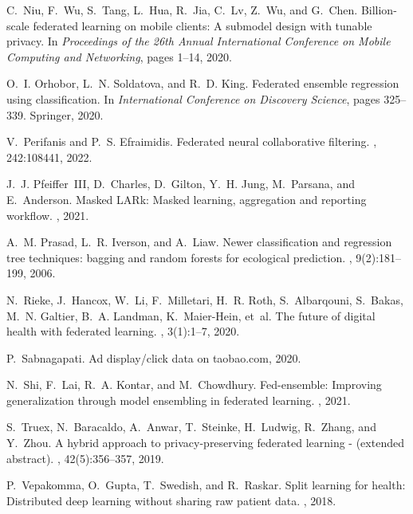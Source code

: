 \documentclass{article}
\begin{document}
\begin{thebibliography}{10}
C.~Niu, F.~Wu, S.~Tang, L.~Hua, R.~Jia, C.~Lv, Z.~Wu, and G.~Chen.
\newblock Billion-scale federated learning on mobile clients: A submodel design
  with tunable privacy.
\newblock In {\em Proceedings of the 26th Annual International Conference on
  Mobile Computing and Networking}, pages 1--14, 2020.

O.~I. Orhobor, L.~N. Soldatova, and R.~D. King.
\newblock Federated ensemble regression using classification.
\newblock In {\em International Conference on Discovery Science}, pages
  325--339. Springer, 2020.

V.~Perifanis and P.~S. Efraimidis.
\newblock Federated neural collaborative filtering.
, 242:108441, 2022.

J.~J. Pfeiffer~III, D.~Charles, D.~Gilton, Y.~H. Jung, M.~Parsana, and
  E.~Anderson.
\newblock Masked {LARk}: Masked learning, aggregation and reporting workflow.
, 2021.

A.~M. Prasad, L.~R. Iverson, and A.~Liaw.
\newblock Newer classification and regression tree techniques: bagging and
  random forests for ecological prediction.
, 9(2):181--199, 2006.

N.~Rieke, J.~Hancox, W.~Li, F.~Milletari, H.~R. Roth, S.~Albarqouni, S.~Bakas,
  M.~N. Galtier, B.~A. Landman, K.~Maier-Hein, et~al.
\newblock The future of digital health with federated learning.
, 3(1):1--7, 2020.

P.~Sabnagapati.
\newblock Ad display/click data on taobao.com, 2020.

N.~Shi, F.~Lai, R.~A. Kontar, and M.~Chowdhury.
\newblock Fed-ensemble: Improving generalization through model ensembling in
  federated learning.
, 2021.

S.~Truex, N.~Baracaldo, A.~Anwar, T.~Steinke, H.~Ludwig, R.~Zhang, and Y.~Zhou.
\newblock A hybrid approach to privacy-preserving federated learning -
  (extended abstract).
, 42(5):356--357, 2019.

P.~Vepakomma, O.~Gupta, T.~Swedish, and R.~Raskar.
\newblock Split learning for health: Distributed deep learning without sharing
  raw patient data.
, 2018.


\end{thebibliography}
\end{document}
